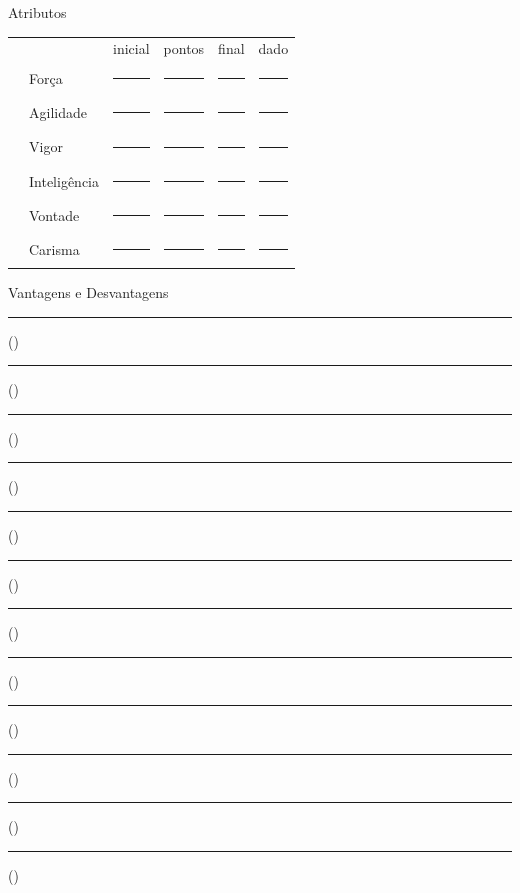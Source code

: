 \documentclass[a4paper,12pt]{article}
\begin{document}
	\begin{minipage}[t][][t]{.49\linewidth}
		{\centering Atributos \\}
		\vspace{.3cm}
		\begin{tabularx}{\textwidth}{ p{.01\linewidth} l X X X X }
			& & inicial & pontos & final & dado \\
			\Mars & Força & \rule{\linewidth}{.5pt}  & \rule{\linewidth}{.5pt}  & \rule{\linewidth}{.5pt} & \rule{\linewidth}{.5pt} \\
			\Mercury & Agilidade  & \rule{\linewidth}{.5pt}  & \rule{\linewidth}{.5pt}  & \rule{\linewidth}{.5pt} & \rule{\linewidth}{.5pt} \\
			\Jupiter & Vigor  & \rule{\linewidth}{.5pt}  & \rule{\linewidth}{.5pt}  & \rule{\linewidth}{.5pt} & \rule{\linewidth}{.5pt} \\
			\Moon & Inteligência  & \rule{\linewidth}{.5pt}  & \rule{\linewidth}{.5pt}  & \rule{\linewidth}{.5pt} & \rule{\linewidth}{.5pt} \\
			\Sun & Vontade  & \rule{\linewidth}{.5pt}  & \rule{\linewidth}{.5pt}  & \rule{\linewidth}{.5pt} & \rule{\linewidth}{.5pt} \\
			\Venus & Carisma  & \rule{\linewidth}{.5pt}  & \rule{\linewidth}{.5pt}  & \rule{\linewidth}{.5pt} & \rule{\linewidth}{.5pt} \\
		\end{tabularx}
	\end{minipage}%
	\hspace{.02\linewidth}
	\begin{minipage}[t][][t]{.49\linewidth}
		{\centering Vantagens e Desvantagens \\[\baselineskip]}
		\vspace{.18cm}
		\rule{.4\linewidth}{.5pt}(\hspace{.05\linewidth}) \rule{.4\linewidth}{.5pt}(\hspace{.05\linewidth}) \\
		\rule{.4\linewidth}{.5pt}(\hspace{.05\linewidth}) \rule{.4\linewidth}{.5pt}(\hspace{.05\linewidth}) \\
		\rule{.4\linewidth}{.5pt}(\hspace{.05\linewidth}) \rule{.4\linewidth}{.5pt}(\hspace{.05\linewidth}) \\
		\rule{.4\linewidth}{.5pt}(\hspace{.05\linewidth}) \rule{.4\linewidth}{.5pt}(\hspace{.05\linewidth}) \\
		\rule{.4\linewidth}{.5pt}(\hspace{.05\linewidth}) \rule{.4\linewidth}{.5pt}(\hspace{.05\linewidth}) \\
		\rule{.4\linewidth}{.5pt}(\hspace{.05\linewidth}) \rule{.4\linewidth}{.5pt}(\hspace{.05\linewidth}) \\
	\end{minipage} \\
	
\end{document}

